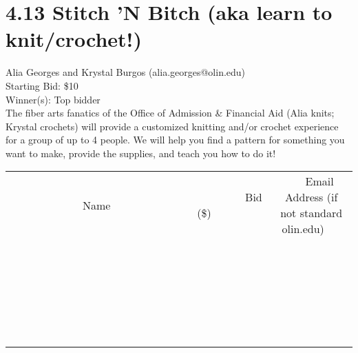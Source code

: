 \documentclass[11pt]{article}
\begin{document}
\section*{4.13 Stitch 'N Bitch (aka learn to knit/crochet!)}
Alia Georges and Krystal Burgos (alia.georges@olin.edu) \\
Starting Bid: \$10 \\
Winner(s): 
Top bidder \\
The fiber arts fanatics of the Office of Admission \& Financial Aid (Alia knits; Krystal crochets) will provide a customized knitting and/or crochet experience for a group of up to 4 people. We will help you find a pattern for something you want to make, provide the supplies, and teach you how to do it! \\[6ex]
\begin{tabular}{c c c}
~~~~~~~~~~~~~Name~~~~~~~~~~~~~ & ~~~~~~~~~Bid (\$)~~~~~~~~~ & ~~~Email Address (if not standard olin.edu)~~~ \\
 & & \\
\hline
 & & \\
\hline
 & & \\
\hline
 & & \\
\hline
 & & \\
\hline
 & & \\
\hline
 & & \\
\hline
 & & \\
\hline
 & & \\
\hline
 & & \\
\hline
 & & \\
\hline
 & & \\
\hline
 & & \\
\hline
 & & \\
\hline
 & & \\
\hline
 & & \\
\hline
 & & \\
\hline
 & & \\
\hline
 & & \\
\hline
 & & \\
\hline
 & & \\
\hline
 & & \\
\hline
 & & \\
\hline
 & & \\
\hline
 & & \\
\hline
 & & \\
\hline
\end{tabular}
\clearpage
\end{document}
